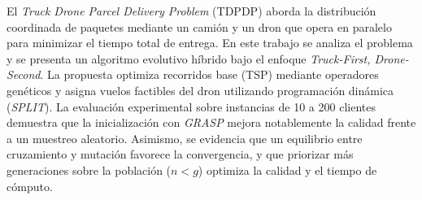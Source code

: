 El \textit{Truck Drone Parcel Delivery Problem} (TDPDP) aborda la distribución coordinada de paquetes mediante un camión y un dron que opera en paralelo para minimizar el tiempo total de entrega. En este trabajo se analiza el problema y se presenta un algoritmo evolutivo híbrido bajo el enfoque \textit{Truck-First, Drone-Second}. La propuesta optimiza recorridos base (TSP) mediante operadores genéticos y asigna vuelos factibles del dron utilizando programación dinámica (\textit{SPLIT}). La evaluación experimental sobre instancias de 10 a 200 clientes demuestra que la inicialización con \textit{GRASP} mejora notablemente la calidad frente a un muestreo aleatorio. Asimismo, se evidencia que un equilibrio entre cruzamiento y mutación favorece la convergencia, y que priorizar más generaciones sobre la población ($n < g$) optimiza la calidad y el tiempo de cómputo.
